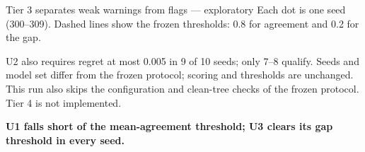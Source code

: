 \begin{frame}{Tier 3 separates weak warnings from flags --- exploratory}
\fontsize{8}{9.6}\selectfont
Each dot is one seed (300--309). Dashed lines show the frozen thresholds: 0.8 for agreement and 0.2 for the gap.
\par\medskip
{}\par\smallskip U2 also requires regret at most 0.005 in 9 of 10 seeds; only 7--8 qualify. Seeds and model set differ from the frozen protocol; scoring and thresholds are unchanged. This run also skips the configuration and clean-tree checks of the frozen protocol. Tier 4 is not implemented.
\par\medskip
\textbf{U1 falls short of the mean-agreement threshold; U3 clears its gap threshold in every seed.}
\end{frame}
